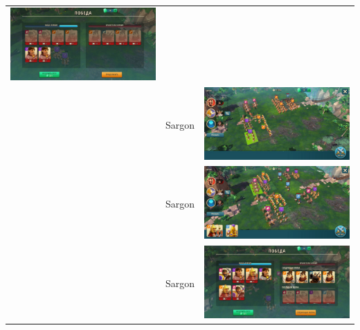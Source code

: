 \begin{longtable}{|c|c|c|}
    \includegraphics[width=0.75\linewidth]{./parts/media/TreasureHunt/32/sargon/photo_2022-04-07_10-05-45.jpg} \\
    & Sargon &
    \includegraphics[width=0.75\linewidth]{./parts/media/TreasureHunt/32/sargon/photo_2022-04-07_10-05-42.jpg} \\
    & Sargon &
    \includegraphics[width=0.75\linewidth]{./parts/media/TreasureHunt/32/sargon/photo_2022-04-07_10-05-31.jpg} \\
    & Sargon &
    \includegraphics[width=0.75\linewidth]{./parts/media/TreasureHunt/32/sargon/photo_2022-04-07_10-05-39.jpg} \\

\end{longtable}
